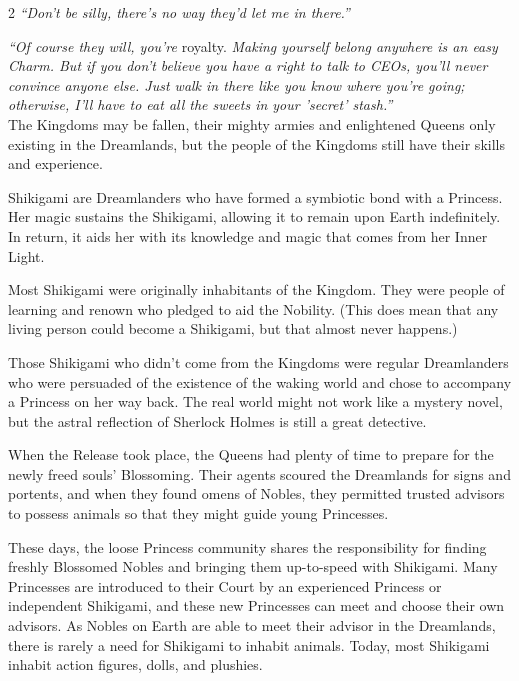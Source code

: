 \begin{multicols}{2}
\textit{“Don't be silly, there's no way they'd let me in there.”}

\textit{“Of course they will, you're} royalty. \textit{Making yourself belong anywhere is an easy Charm. But if you don't believe you have a right to talk to CEOs, you'll never convince anyone else. Just walk in there like you know where you're going; otherwise, I'll have to eat all the sweets in your 'secret' stash.”}\\

\noindent The Kingdoms may be fallen, their mighty armies and enlightened Queens only existing in the Dreamlands, but the people of the Kingdoms still have their skills and experience.

Shikigami are Dreamlanders who have formed a symbiotic bond with a Princess. Her magic sustains the Shikigami, allowing it to remain upon Earth indefinitely. In return, it aids her with its knowledge and magic that comes from her Inner Light.

Most Shikigami were originally inhabitants of the Kingdom. They were people of learning and renown who pledged to aid the Nobility. (This does mean that any living person could become a Shikigami, but that almost never happens.)

Those Shikigami who didn't come from the Kingdoms were regular Dreamlanders who were persuaded of the existence of the waking world and chose to accompany a Princess on her way back. The real world might not work like a mystery novel, but the astral reflection of Sherlock Holmes is still a great detective.

When the Release took place, the Queens had plenty of time to prepare for the newly freed souls' Blossoming. Their agents scoured the Dreamlands for signs and portents, and when they found omens of Nobles, they permitted trusted advisors to possess animals so that they might guide young Princesses.

These days, the loose Princess community shares the responsibility for finding freshly Blossomed Nobles and bringing them up-to-speed with Shikigami. Many Princesses are introduced to their Court by an experienced Princess or independent Shikigami, and these new Princesses can meet and choose their own advisors. As Nobles on Earth are able to meet their advisor in the Dreamlands, there is rarely a need for Shikigami to inhabit animals. Today, most Shikigami inhabit action figures, dolls, and plushies.


\end{multicols}
